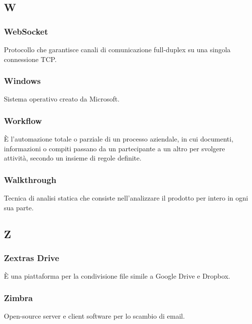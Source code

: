 \subsection*{W}
\subsubsection*{WebSocket} Protocollo che garantisce canali di comunicazione full-duplex su una singola connessione TCP.
\subsubsection*{Windows} Sistema operativo creato da Microsoft.
\subsubsection*{Workflow} È l’automazione totale o parziale di un processo aziendale, in cui documenti, informazioni o compiti passano da un partecipante a un altro per svolgere attività, secondo un insieme di regole definite.
\subsubsection*{Walkthrough} Tecnica di analisi statica che consiste nell’analizzare il prodotto per intero in ogni sua parte.
\subsection*{Z}
\subsubsection*{Zextras Drive} È una piattaforma per la condivisione file simile a Google Drive e Dropbox.
\subsubsection*{Zimbra} Open-source server e client software per lo scambio di email.

